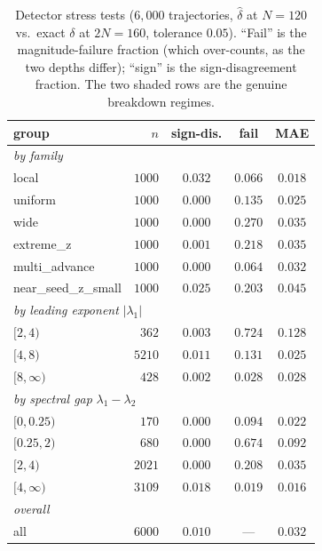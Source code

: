 \documentclass[11pt,a4paper]{article}
\theoremstyle{definition}
\newcommand{\dhat}{\hat{\delta}}
\begin{document}
\begin{table}[t]\centering
\caption{Detector stress tests ($6{,}000$ trajectories, $\dhat$ at $N{=}120$ vs.\ exact
$\delta$ at $2N{=}160$, tolerance $0.05$). ``Fail'' is the magnitude-failure fraction (which
over-counts, as the two depths differ); ``sign'' is the sign-disagreement fraction. The two
shaded rows are the genuine breakdown regimes.}
\label{tab:stress}
\begin{tabular}{lrccc}
\toprule
group & $n$ & sign-dis. & fail & MAE \\
\midrule
\multicolumn{5}{l}{\emph{by family}}\\
\quad local              & $1000$ & $0.032$ & $0.066$ & $0.018$ \\
\quad uniform            & $1000$ & $0.000$ & $0.135$ & $0.025$ \\
\quad wide               & $1000$ & $0.000$ & $0.270$ & $0.035$ \\
\quad extreme\_z         & $1000$ & $0.001$ & $0.218$ & $0.035$ \\
\quad multi\_advance     & $1000$ & $0.000$ & $0.064$ & $0.032$ \\
\quad near\_seed\_z\_small & $1000$ & $0.025$ & $0.203$ & $0.045$ \\
\midrule
\multicolumn{5}{l}{\emph{by leading exponent} $|\lambda_1|$}\\
\rowcolor{gray!15}\quad $[2,4)$   & $362$  & $0.003$ & $0.724$ & $0.128$ \\
\quad $[4,8)$            & $5210$ & $0.011$ & $0.131$ & $0.025$ \\
\quad $[8,\infty)$       & $428$  & $0.002$ & $0.028$ & $0.028$ \\
\midrule
\multicolumn{5}{l}{\emph{by spectral gap} $\lambda_1-\lambda_2$}\\
\quad $[0,0.25)$         & $170$  & $0.000$ & $0.094$ & $0.022$ \\
\rowcolor{gray!15}\quad $[0.25,2)$  & $680$  & $0.000$ & $0.674$ & $0.092$ \\
\quad $[2,4)$            & $2021$ & $0.000$ & $0.208$ & $0.035$ \\
\quad $[4,\infty)$       & $3109$ & $0.018$ & $0.019$ & $0.016$ \\
\midrule
\multicolumn{5}{l}{\emph{overall}} \\
\quad all                & $6000$ & $0.010$ & --- & $0.032$ \\
\bottomrule
\end{tabular}
\end{table}
\end{document}
